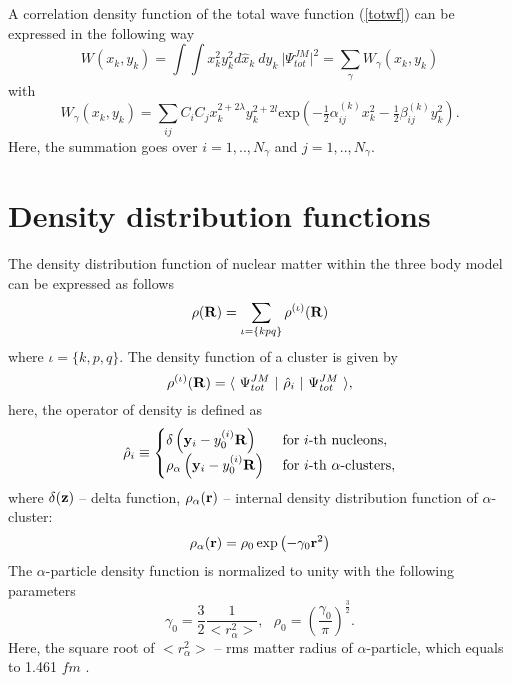 \documentclass[
12pt, %
oneside, %
english, %
doublespacing, %
doublespacing, %
toctotoc, %
parskip, %
headsepline, %
]{MastersDoctoralThesis} %
\begin{document}
A correlation density function of the total wave function (\ref{totwf})  can be expressed in the following way
\begin{equation}
W\left( x_k,y_k \right) =
\int \int x_k^2 y_k^2 d\hat{x}_k~ d\hat{y}_k~ \vert \Psi^{JM}_{tot} \vert^2
=
 \sum_{\gamma}  W_{\gamma}\left( x_k,y_k \right)
 \label{wf_cor_density}
\end{equation}
with 
\begin{equation}
W_{\gamma}\left( x_k,y_k \right) = \sum_{ij} C_i C_j x^{2+2\lambda}_k y^{2+2l}_k \text{exp}\left( - \tfrac{1}{2} \alpha^{(k)}_{ij} x_k^2 -  \tfrac{1}{2} \beta^{(k)}_{ij} y_k^2 \right) .
\end{equation}
Here, the summation goes over $i=1,..,N_\gamma$ and $j=1,..,N_\gamma$.


\section{Density distribution functions}
\label{section_density_function}

The density distribution function of nuclear matter within the three body model can be expressed as follows
\begin{equation}
\rho({\bf R}) = \sum_{\iota=\{kpq\}} \rho^{(\iota)} ({\bf R})
\end{equation}
where $\iota=\{k,p,q\}$.
The density function of a cluster is given by
\begin{equation}
\rho^{(\iota)}({\bf R})=
\langle~ \Psi_{tot}^{JM} ~\vert~ \hat{\rho}_i~ \vert~ \Psi_{tot}^{JM} ~\rangle,
\end{equation}
here, the operator of density is defined as
\begin{equation}
\hat{\rho}_i\equiv
\begin{cases}
\delta \left( {\bf y}_i - y_0^{(i)} {\bf R} \right) 
& ~{\rm for}~ i{\rm \text -th~nucleons} , \\
\rho_{\alpha} \left( {\bf y}_i - y_0^{(i)} {\bf R} \right)  & 
~{\rm for}~ i{\rm \text -th~\alpha\text -clusters},
\end{cases}
\end{equation}
where $\delta({\bf z})$ -- delta function, $\rho_\alpha({\bf r})$ -- internal density distribution function of $\alpha$-cluster:
\begin{equation}
\rho_{\alpha}({\bf r}) = \rho_0 \exp \left( - \gamma_0 {\bf r}^2 \right)
\end{equation}
The $\alpha$-particle density function is normalized to unity with the following parameters
\begin{equation}
\gamma_0=\frac{3}{2} \frac{1}{<r_\alpha^2>},~~~\rho_0=\left( \frac{\gamma_0}{\pi} \right)^{\tfrac{3}{2}}.
\label{rho_alpha_parameters}
\end{equation}
Here,  the square root of $<r_\alpha^2>$ -- rms matter radius of $\alpha$-particle, which equals to 1.461 $fm$ \cite{satchler1979folding}.
\end{document}
